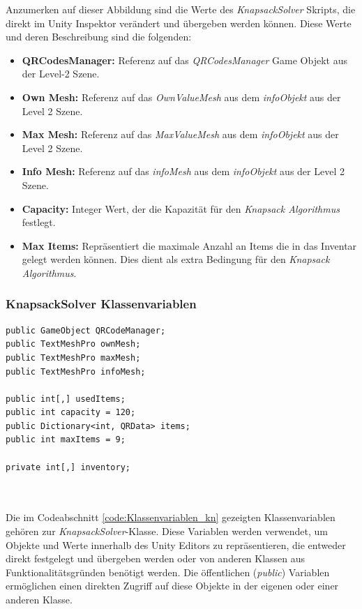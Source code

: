 Anzumerken auf dieser Abbildung sind die Werte des \textit{KnapsackSolver} Skripts, die direkt im Unity Inspektor verändert
und übergeben werden können. Diese Werte und deren Beschreibung sind die folgenden:

\begin{itemize}
    \item \textbf{QRCodesManager:} Referenz auf das \textit{QRCodesManager} Game Objekt aus der Level-2 Szene.
    \item \textbf{Own Mesh:} Referenz auf das \textit{OwnValueMesh} aus dem \textit{infoObjekt} aus der Level 2 Szene.
    \item \textbf{Max Mesh:} Referenz auf das \textit{MaxValueMesh} aus dem \textit{infoObjekt} aus der Level 2 Szene.
    \item \textbf{Info Mesh:} Referenz auf das \textit{infoMesh} aus dem \textit{infoObjekt} aus der Level 2 Szene.
    \item \textbf{Capacity:} Integer Wert, der die Kapazität für den \textit{Knapsack Algorithmus} festlegt.
    \item \textbf{Max Items:} Repräsentiert die maximale Anzahl an Items die in das Inventar gelegt werden können. Dies
    dient als extra Bedingung für den \textit{Knapsack Algorithmus}.\\
\end{itemize}

\subsubsection{KnapsackSolver Klassenvariablen}
\begin{lstlisting}[style=csharp, caption={Klassenvariablen des KnapsackSolvers}, label=code:Klassenvariablen_kn]
public GameObject QRCodeManager;
public TextMeshPro ownMesh;
public TextMeshPro maxMesh;
public TextMeshPro infoMesh;

public int[,] usedItems;
public int capacity = 120;
public Dictionary<int, QRData> items;
public int maxItems = 9;

private int[,] inventory;
\end{lstlisting}\\
\\
Die im Codeabschnitt \ref{code:Klassenvariablen_kn} gezeigten Klassenvariablen gehören zur \textit{KnapsackSolver}-Klasse.
Diese Variablen werden verwendet, um Objekte und Werte innerhalb des Unity Editors zu repräsentieren, die entweder direkt
festgelegt und übergeben werden oder von anderen Klassen aus Funktionalitätsgründen benötigt werden. Die öffentlichen
(\textit{public}) Variablen ermöglichen einen direkten Zugriff auf diese Objekte in der eigenen oder einer anderen Klasse.

